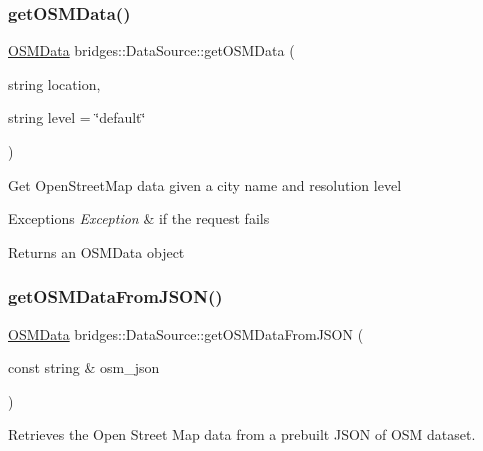 \subsubsection{\texorpdfstring{get\+O\+S\+M\+Data()}{getOSMData()}\hspace{0.1cm}{\footnotesize\ttfamily [2/2]}}
{\footnotesize\ttfamily \mbox{\hyperlink{classbridges_1_1dataset_1_1_o_s_m_data}{O\+S\+M\+Data}} bridges\+::\+Data\+Source\+::get\+O\+S\+M\+Data (\begin{DoxyParamCaption}\item[{string}]{location,  }\item[{string}]{level = {\ttfamily \char`\"{}default\char`\"{}} }\end{DoxyParamCaption})\hspace{0.3cm}{\ttfamily [inline]}}

Get Open\+Street\+Map data given a city name and resolution level


\begin{DoxyExceptions}{Exceptions}
{\em Exception} & if the request fails\\
\hline
\end{DoxyExceptions}
\begin{DoxyReturn}{Returns}
an O\+S\+M\+Data object 
\end{DoxyReturn}
\mbox{\label{classbridges_1_1_data_source_a1b483de1cce9921b70116213382cdaf0}} 
\subsubsection{\texorpdfstring{get\+O\+S\+M\+Data\+From\+J\+S\+O\+N()}{getOSMDataFromJSON()}}
{\footnotesize\ttfamily \mbox{\hyperlink{classbridges_1_1dataset_1_1_o_s_m_data}{O\+S\+M\+Data}} bridges\+::\+Data\+Source\+::get\+O\+S\+M\+Data\+From\+J\+S\+ON (\begin{DoxyParamCaption}\item[{const string \&}]{osm\+\_\+json }\end{DoxyParamCaption})\hspace{0.3cm}{\ttfamily [inline]}}

Retrieves the Open Street Map data from a prebuilt J\+S\+ON of O\+SM dataset.


